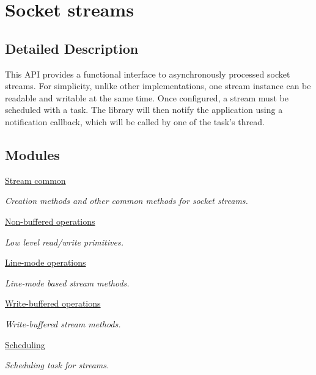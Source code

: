 \hypertarget{group__stream}{
\section{Socket streams}
\label{group__stream}
}


\subsection{Detailed Description}
This API provides a functional interface to asynchronously processed socket streams. For simplicity, unlike other implementations, one stream instance can be readable and writable at the same time. Once configured, a stream must be scheduled with a task. The library will then notify the application using a notification callback, which will be called by one of the task's thread. 

\subsection*{Modules}
\begin{CompactItemize}
\item 
\hyperlink{group__stream__common}{Stream common}
\begin{CompactList}\small\item\em Creation methods and other common methods for socket streams. \item\end{CompactList}

\item 
\hyperlink{group__stream__low}{Non-buffered operations}
\begin{CompactList}\small\item\em Low level read/write primitives. \item\end{CompactList}

\item 
\hyperlink{group__stream__line}{Line-mode operations}
\begin{CompactList}\small\item\em Line-mode based stream methods. \item\end{CompactList}

\item 
\hyperlink{group__stream__buf}{Write-buffered operations}
\begin{CompactList}\small\item\em Write-buffered stream methods. \item\end{CompactList}

\item 
\hyperlink{group__stream__sched}{Scheduling}
\begin{CompactList}\small\item\em Scheduling task for streams. \item\end{CompactList}

\end{CompactItemize}
